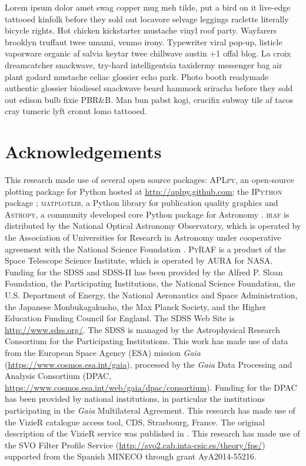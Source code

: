 \documentclass[apj, revtex4-1]{emulateapj}
\begin{document}
Lorem ipsum dolor amet swag copper mug meh tilde, put a bird on it live-edge tattooed kinfolk before they sold out locavore selvage leggings raclette literally bicycle rights. Hot chicken kickstarter mustache vinyl roof party. Wayfarers brooklyn truffaut twee umami, venmo irony. Typewriter viral pop-up, listicle vaporware organic af salvia keytar twee chillwave austin +1 offal blog. La croix dreamcatcher snackwave, try-hard intelligentsia taxidermy messenger bag air plant godard mustache celiac glossier echo park. Photo booth readymade authentic glossier biodiesel snackwave beard hammock sriracha before they sold out edison bulb fixie PBR\&B. Man bun pabst kogi, crucifix subway tile af tacos cray tumeric lyft cronut lomo tattooed.

\section*{Acknowledgements}
This research made use of several open source packages: \textsc{APLpy}, an open-source plotting package for Python hosted at \url{http://aplpy.github.com}; the \textsc{IPython} package \citep{Perez2007}; \textsc{matplotlib}, a Python library for publication quality graphics \citep{Hunter2007} and \textsc{Astropy}, a community developed core Python package for Astronomy \citep{TheAstropyCollaboration2013}.
\textsc{iraf} is distributed by the National Optical Astronomy Observatory, which is operated by the Association of Universities for Research in Astronomy under cooperative agreement with the National Science Foundation \citep{Tody1993}.
\textsc{PyRAF} is a product of the Space Telescope Science Institute, which is operated by AURA for NASA.
Funding for the SDSS and SDSS-II has been provided by the Alfred P. Sloan Foundation, the Participating Institutions, the National Science Foundation, the U.S. Department of Energy, the National Aeronautics and Space Administration, the Japanese Monbukagakusho, the Max Planck Society, and the Higher Education Funding Council for England. The SDSS Web Site is \url{http://www.sdss.org/}. The SDSS is managed by the Astrophysical Research Consortium for the Participating Institutions.
This work has made use of data from the European Space Agency (ESA) mission {\it Gaia} (\url{https://www.cosmos.esa.int/gaia}), processed by the {\it Gaia} Data Processing and Analysis Consortium (DPAC, \url{https://www.cosmos.esa.int/web/gaia/dpac/consortium}). Funding for the DPAC has been provided by national institutions, in particular the institutions participating in the {\it Gaia} Multilateral Agreement.
This research has made use of the VizieR catalogue access tool, CDS, Strasbourg, France. The original description of the VizieR service was published in \cite{Ochsenbein2000}.
This research has made use of the SVO Filter Profile Service (\url{http://svo2.cab.inta-csic.es/theory/fps/}) supported from the Spanish MINECO through grant AyA2014-55216.




\end{document}

